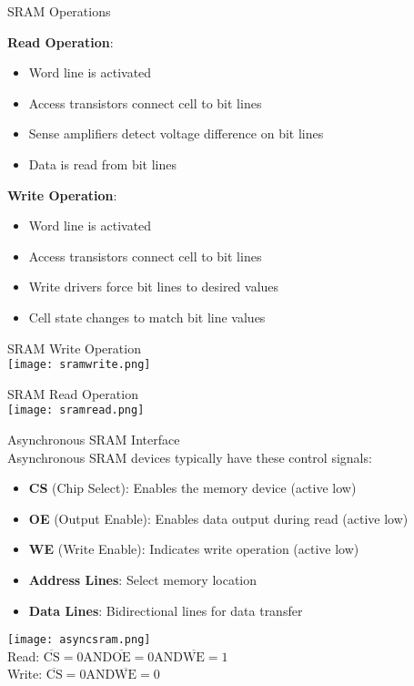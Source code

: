\begin{theorem}{SRAM Operations}

\begin{minipage}{0.5\linewidth}
\textbf{Read Operation}:
\begin{itemize}
    \item Word line is activated
    \item Access transistors connect cell to bit lines
    \item Sense amplifiers detect voltage difference on bit lines
    \item Data is read from bit lines
\end{itemize}
\end{minipage}
\begin{minipage}{0.5\linewidth}
\textbf{Write Operation}:
\begin{itemize}
    \item Word line is activated
    \item Access transistors connect cell to bit lines
    \item Write drivers force bit lines to desired values
    \item Cell state changes to match bit line values
\end{itemize}
\end{minipage}
\end{theorem}





\begin{corollary}{SRAM Write Operation}\\
    \texttt{[image: sramwrite.png]}
\end{corollary}

\begin{corollary}{SRAM Read Operation}\\
    \texttt{[image: sramread.png]}
\end{corollary}

\begin{definition}{Asynchronous SRAM Interface}\\
Asynchronous SRAM devices typically have these control signals:
\begin{itemize}
    \item \textbf{CS} (Chip Select): Enables the memory device (active low)
    \item \textbf{OE} (Output Enable): Enables data output during read (active low)
    \item \textbf{WE} (Write Enable): Indicates write operation (active low)
    \item \textbf{Address Lines}: Select memory location
    \item \textbf{Data Lines}: Bidirectional lines for data transfer
\end{itemize}
\texttt{[image: asyncsram.png]}\\
Read: $\overline{\mathrm{CS}}=0 \mathrm{AND} \overline{\mathrm{OE}}=0 \mathrm{AND} \overline{\mathrm{WE}}=1$\\
Write: $\overline{\mathrm{CS}}=0 \mathrm{AND} \overline{\mathrm{WE}}=0$
\end{definition}

